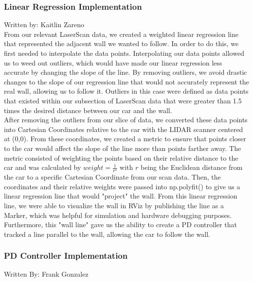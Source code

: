 \documentclass{article}
\begin{document}
\subsubsection{Linear Regression Implementation}
Written by: Kaitlin Zareno\\

From our relevant LaserScan data, we created a weighted linear regression line that represented the adjacent wall we wanted to follow. In order to do this, we first needed to interpolate the data points. Interpolating our data points allowed us to weed out outliers, which would have made our linear regression less accurate by changing the slope of the line. By removing outliers, we avoid drastic changes to the slope of our regression line that would not accurately represent the real wall, allowing us to follow it. Outliers in this case were defined as data points that existed within our subsection of LaserScan data that were greater than 1.5 times the desired distance between our car and the wall. \\

After removing the outliers from our slice of data, we converted these data points into Cartesian Coordinates relative to the car with the LIDAR scanner centered at (0,0). From these coordinates, we created a metric to ensure that points closer to the car would affect the slope of the line more than points farther away. The metric consisted of weighting the points based on their relative distance to the car and was calculated by $weight = \frac{1}{r^3}$ with $r$ being the Euclidean distance from the car to a specific Cartesian Coordinate from our scan data. Then, the coordinates and their relative weights were passed into np.polyfit() to give us a linear regression line that would "project" the wall. From this linear regression line, we were able to visualize the wall in RViz by publishing the line as a Marker, which was helpful for simulation and hardware debugging purposes. Furthermore, this "wall line" gave us the ability to create a PD controller that tracked a line parallel to the wall, allowing the car to follow the wall.

\subsubsection{PD Controller Implementation}
Written By: Frank Gonzalez\\
\end{document}
